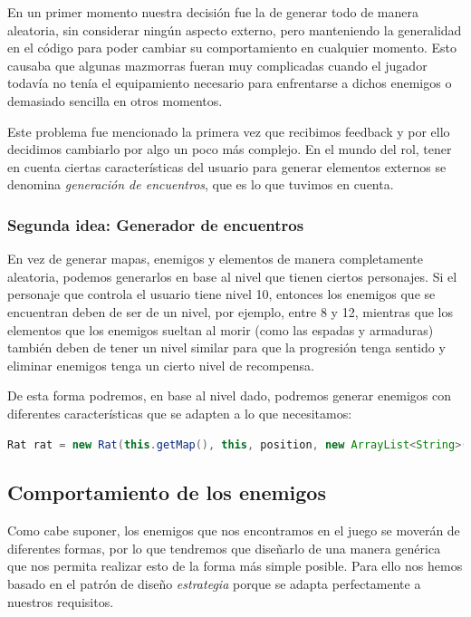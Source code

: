 En un primer momento nuestra decisión fue la de generar todo de manera aleatoria, sin considerar ningún aspecto externo, pero manteniendo la generalidad en el código para poder cambiar su comportamiento en cualquier momento. Esto causaba que algunas mazmorras fueran muy complicadas cuando el jugador todavía no tenía el equipamiento necesario para enfrentarse a dichos enemigos o demasiado sencilla en otros momentos.

Este problema fue mencionado la primera vez que recibimos feedback y por ello decidimos cambiarlo por algo un poco más complejo. En el mundo del rol, tener en cuenta ciertas características del usuario para generar elementos externos se denomina \textit{generación de encuentros}, que es lo que tuvimos en cuenta.

\subsubsection{Segunda idea: Generador de encuentros}
\label{generadorencuentros}

En vez de generar mapas, enemigos y elementos de manera completamente aleatoria, podemos generarlos en base al nivel que tienen ciertos personajes. Si el personaje que controla el usuario tiene nivel 10, entonces los enemigos que se encuentran deben de ser de un nivel, por ejemplo, entre 8 y 12, mientras que los elementos que los enemigos sueltan al morir (como las espadas y armaduras) también deben de tener un nivel similar para que la progresión tenga sentido y eliminar enemigos tenga un cierto nivel de recompensa.

De esta forma podremos, en base al nivel dado, podremos generar enemigos con diferentes características que se adapten a lo que necesitamos:

\begin{lstlisting}[language=java]
Rat rat = new Rat(this.getMap(), this, position, new ArrayList<String>(), level);
\end{lstlisting}

\subsection{Comportamiento de los enemigos}

Como cabe suponer, los enemigos que nos encontramos en el juego se moverán de diferentes formas, por lo que tendremos que diseñarlo de una manera genérica que nos permita realizar esto de la forma más simple posible.
Para ello nos hemos basado en el patrón de diseño \textit{estrategia} porque se adapta perfectamente a nuestros requisitos.

